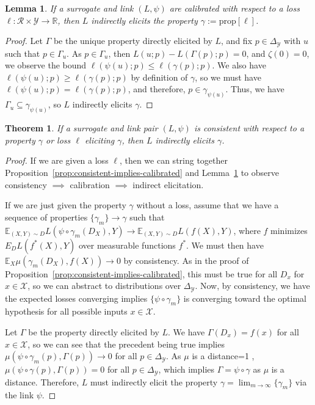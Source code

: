\documentclass{article}
\newcommand{\Comments}{1}
\newcommand{\mytodo}[2]{\ifnum\Comments=1%
	\todo[linecolor=#1!80!black,backgroundcolor=#1,bordercolor=#1!80!black]{#2}\fi}
\newcommand{\jessiet}[1]{\mytodo{purple!20!white}{JF: #1}}
\newcommand{\reals}{\mathbb{R}}
\newcommand{\simplex}{\Delta_\Y}
\newcommand{\prop}[1]{\mathrm{prop}[#1]}
\newcommand{\E}{\mathbb{E}}
\newcommand{\R}{\mathcal{R}}
\newcommand{\X}{\mathcal{X}}
\newcommand{\Y}{\mathcal{Y}}
\newtheorem{theorem}{Theorem}
\newtheorem{lemma}{Lemma}
\begin{document}
\begin{lemma}\label{lem:calib-implies-indir}
	If a surrogate and link $(L, \psi)$ are calibrated with respect to a loss $\ell:\R \times\Y \to \reals$, then $L$ indirectly elicits the property $\gamma := \prop{\ell}$.
\end{lemma}
\begin{proof}
	Let $\Gamma$ be the unique property directly elicited by $L$, and fix $p \in \simplex$ with $u$ such that $p \in \Gamma_u$.
	As $p \in \Gamma_u$, then $L(u;p) - L(\Gamma(p); p) = 0$, and $\zeta(0) = 0$, we observe the bound $\ell(\psi(u); p) \leq \ell(\gamma(p); p)$.
	We also have $\ell(\psi(u); p) \geq \ell(\gamma(p); p)$ by definition of $\gamma$, so we must have $\ell(\psi(u);p) = \ell(\gamma(p); p)$, and therefore, $p \in \gamma_{\psi(u)}$.
	Thus, we have $\Gamma_u \subseteq \gamma_{\psi(u)}$, so $L$ indirectly elicits $\gamma$.
\end{proof}

\begin{theorem}\label{thm:consistent-implies-indir-elic}
	If a surrogate and link pair $(L, \psi)$ is consistent with respect to a property $\gamma$ or loss $\ell$ eliciting $\gamma$, then $L$ indirectly elicits $\gamma$.
\end{theorem}
\begin{proof}
If we are given a loss $\ell$, then we can string together Proposition~\ref{prop:consistent-implies-calibrated} and Lemma~\ref{lem:calib-implies-indir} to observe consistency $\implies$ calibration $\implies$ indirect elicitation.

If we are just given the property $\gamma$ without a loss, assume that we have a sequence of properties $\{\gamma_m\} \to \gamma$ such that $\E_{(X,Y) \sim D} L( \psi \circ \gamma_m(D_X), Y) \to \E_{(X,Y) \sim D} L(f(X), Y)$, where $f$ minimizes $E_D L(f^*(X), Y)$ over measurable functions $f^*$.
We must then have $\E_X \mu(\gamma_m(D_X), f(X)) \to 0$ by consistency.
As in the proof of Proposition~\ref{prop:consistent-implies-calibrated}, this must be true for all $D_x$ for $x \in \X$, so we can abstract to distributions over $\simplex$.
Now, by consistency, we have the expected losses converging implies $\{\psi \circ \gamma_m\}$ is converging toward the optimal hypothesis for all possible inputs $x \in \X$.

Let $\Gamma$ be the property directly elicited by $L$.
We have $\Gamma(D_x) = f(x)$ for all $x \in \X$, so we can see that the precedent being true implies $\mu(\psi \circ \gamma_m(p), \Gamma(p)) \to 0$ for all $p\in \simplex$.
As $\mu$ is a distance\jessiet{Maybe need $\mu$ continuous in $\R^2$?}, $\mu(\psi \circ \gamma(p), \Gamma(p)) = 0$ for all $p \in \simplex$, which implies $\Gamma = \psi \circ \gamma$ as $\mu$ is a distance.
Therefore, $L$ must indirectly elicit the property $\gamma = \lim_{m \to \infty} \{\gamma_m\}$ via the link $\psi$.
\end{proof}
\end{document}
